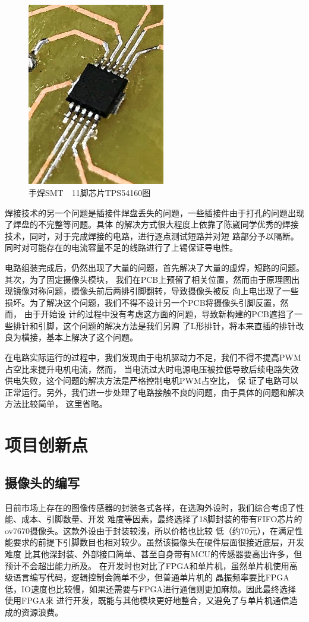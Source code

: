 \documentclass[a4paper]{paper}
\begin{document}
\begin{figure}
    \centering
    \includegraphics[width = 60mm]{SMT.jpg}
    \caption{手焊SMT\ \ 11脚芯片TPS54160图}
    \label{ex}
\end{figure}
焊接技术的另一个问题是插接件焊盘丢失的问题，一些插接件由于打孔的问题出现了焊盘的不完整等问题。具体
的解决方式很大程度上依靠了陈崴同学优秀的焊接技术，同时，对于完成焊接的电路，进行逐点测试短路并对短
路部分予以隔断。同时对可能存在的电流容量不足的线路进行了上锡保证导电性。

电路组装完成后，仍然出现了大量的问题，首先解决了大量的虚焊，短路的问题。其次，为了固定摄像头模块，
我们在PCB上预留了相关位置，然而由于原理图出现镜像对称问题，摄像头前后两排引脚翻转，导致摄像头被反
向上电出现了一些损坏。为了解决这个问题，我们不得不设计另一个PCB将摄像头引脚反置，然而， 由于开始设
计的过程中没有考虑这方面的问题，导致新构建的PCB遮挡了一些排针和引脚，这个问题的解决方法是我们另购
了L形排针，将本来直插的排针改良为横接，基本上解决了这个问题。

在电路实际运行的过程中，我们发现由于电机驱动力不足，我们不得不提高PWM占空比来提升电机电流，然而，
当电流过大时电源电压被拉低导致后续电路失效供电失败，这个问题的解决方法是严格控制电机PWM占空比， 保
证了电路可以正常运行。另外，我们进一步处理了电路接触不良的问题，由于具体的问题和解决方法比较简单，
这里省略。
\section{项目创新点}
\subsection{摄像头的编写}
目前市场上存在的图像传感器的封装各式各样，在选购外设时，我们综合考虑了性能、成本、引脚数量、开发
难度等因素，最终选择了18脚封装的带有FIFO芯片的ov7670摄像头。这款外设由于封装较浅，所以价格也比较
低（约70元），在满足性能要求的前提下引脚数目也相对较少。虽然该摄像头在硬件层面很接近底层，开发难度
比其他深封装、外部接口简单、甚至自身带有MCU的传感器要高出许多，但预计不会超出能力所及。
在开发时也对比了FPGA和单片机，虽然单片机使用高级语言编写代码，逻辑控制会简单不少，但普通单片机的
晶振频率要比FPGA低，IO速度也比较慢，如果还需要与FPGA进行通信则更加麻烦。因此最终选择使用FPGA来
进行开发，既能与其他模块更好地整合，又避免了与单片机通信造成的资源浪费。
\end{document}
